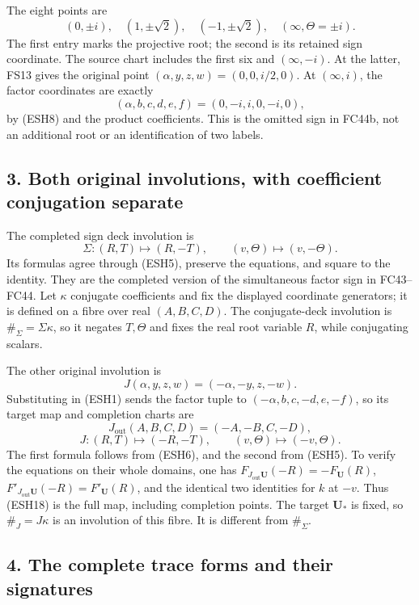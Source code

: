 \documentclass[
  10pt,
  a4paper,
]{article}
\begin{document}
The eight points are \[
(0,\pm i),\quad(1,\pm\sqrt2),\quad(-1,\pm\sqrt2),
\quad(\infty,\Theta=\pm i).
\tag{ESH13}
\] The first entry marks the projective root; the second is its retained
sign coordinate. The source chart includes the first six and
\((\infty,-i)\). At the latter, FS13 gives the original point
\((\alpha,y,z,w)=(0,0,i/2,0)\). At \((\infty,i)\), the factor
coordinates are exactly \[
(\alpha,b,c,d,e,f)=(0,-i,i,0,-i,0),
\tag{ESH14}
\] by (ESH8) and the product coefficients. This is the omitted sign in
FC44b, not an additional root or an identification of two labels.

\subsection{3. Both original involutions, with coefficient conjugation
separate}\label{both-original-involutions-with-coefficient-conjugation-separate}

The completed sign deck involution is \[
\Sigma:(R,T)\longmapsto(R,-T),\qquad
(v,\Theta)\longmapsto(v,-\Theta).
\tag{ESH15}
\] Its formulas agree through (ESH5), preserve the equations, and square
to the identity. They are the completed version of the simultaneous
factor sign in FC43--FC44. Let \(\kappa\) conjugate coefficients and fix
the displayed coordinate generators; it is defined on a fibre over real
\((A,B,C,D)\). The conjugate-deck involution is
\(\#_\Sigma=\Sigma\kappa\), so it negates \(T,\Theta\) and fixes the
real root variable \(R\), while conjugating scalars.

The other original involution is \[
J(\alpha,y,z,w)=(-\alpha,-y,z,-w).
\tag{ESH16}
\] Substituting in (ESH1) sends the factor tuple to
\(( -\alpha,b,c,-d,e,-f)\), so its target map and completion charts are
\[
J_{\mathrm{out}}(A,B,C,D)=(-A,-B,C,-D),
\tag{ESH17}
\] \[
J:(R,T)\longmapsto(-R,-T),\qquad
(v,\Theta)\longmapsto(-v,\Theta).
\tag{ESH18}
\] The first formula follows from (ESH6), and the second from (ESH5). To
verify the equations on their whole domains, one has
\(F_{J_{\mathrm{out}}\mathbf U}(-R)=-F_{\mathbf U}(R)\),
\(F'_{J_{\mathrm{out}}\mathbf U}(-R)=F'_{\mathbf U}(R)\), and the
identical two identities for \(k\) at \(-v\). Thus (ESH18) is the full
map, including completion points. The target \(\mathbf U_*\) is fixed,
so \(\#_J=J\kappa\) is an involution of this fibre. It is different from
\(\#_\Sigma\).

\subsection{4. The complete trace forms and their
signatures}\label{the-complete-trace-forms-and-their-signatures}
\end{document}
